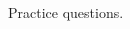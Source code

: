 \documentclass[12pt, a4paper, addpoints]{exam}
\newcommand{\bs}{\vspace{33mm}}
\begin{document}
\begin{questions}
\begin{multicols}{2}
\begin{parts}
\end{parts}
\end{multicols}













\bs

\normalsize
\question Practice questions.
\begin{multicols}{4} %
\end{multicols}
\end{questions}
\end{document}
